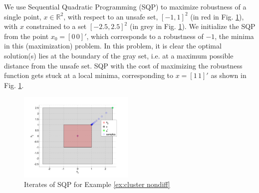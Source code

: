 \begin{exmp}
	\label{ex:cluster nondiff}
	We use Sequential Quadratic Programming (SQP) \cite{Polak97_Optim} to maximize robustness of a single point, $x\in \mathbb{R}^2$, with respect to an unsafe set, $[-1,1]^2$ (in red in Fig. \ref{fig:DumbExample}), with $x$ constrained to a set $[-2.5,2.5]^2$ (in grey in Fig. \ref{fig:DumbExample}). We initialize the SQP from the point $x_0=[0\,0]'$, which corresponds to a robustness of $-1$, the minima in this (maximization) problem. In this problem, it is clear the optimal solution(s) lies at the boundary of the gray set, i.e. at a maximum possible distance from the unsafe set. SQP with the cost of maximizing the robustness function gets stuck at a local minima, corresponding to $x=[1\,1]'$ as shown in Fig. \ref{fig:DumbExample}. 
	
\begin{figure}[t]
\centering
\includegraphics[width=0.49\textwidth]{figures/DumbOptEx}
\caption{Iterates of SQP for Example \ref{ex:cluster nondiff}}
\label{fig:DumbExample}
\end{figure}

\end{exmp}
